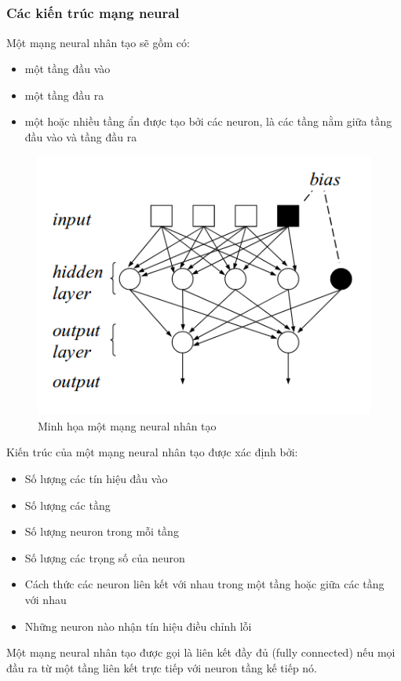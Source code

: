 \documentclass[fontsize=12pt]{scrartcl}
\begin{document}
\subsubsection{Các kiến trúc mạng neural\textsuperscript{\cite{khoattq}}}
Một mạng neural nhân tạo sẽ gồm có:
\begin{itemize}
\item một tầng đầu vào
\item một tầng đầu ra
\item một hoặc nhiều tầng ẩn được tạo bởi các neuron, là các tầng nằm giữa tầng đầu vào và tầng đầu ra
\end{itemize}
\begin{figure}
     \includegraphics[width=\textwidth]{img/neural_sample}
      \caption{Minh họa một mạng neural nhân tạo}
       \label{fig:neural_sample}
\end{figure}
Kiến trúc của một mạng neural nhân tạo được xác định bởi:
\begin{itemize}
\item Số lượng các tín hiệu đầu vào
\item Số lượng các tầng
\item Số lượng neuron trong mỗi tầng
\item Số lượng các trọng số của neuron
\item Cách thức các neuron liên kết với nhau trong một tầng hoặc giữa các tầng với nhau
\item Những neuron nào nhận tín hiệu điều chỉnh lỗi
\end{itemize}
Một mạng neural nhân tạo được gọi là liên kết đầy đủ (fully connected) nếu mọi đầu ra từ một tầng liên kết trực tiếp với neuron tầng kế tiếp nó.
\end{document}
